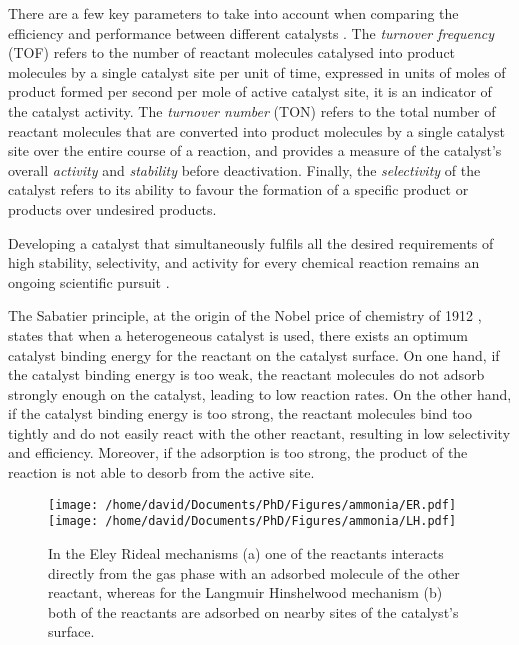 There are a few key parameters to take into account when comparing the efficiency and performance between different catalysts \parencite{Boudart1995, Zhang2019, Wachs2022}.
The \textit{turnover frequency} (TOF) refers to the number of reactant molecules catalysed into product molecules by a single catalyst site per unit of time, expressed in units of moles of product formed per second per mole of active catalyst site, it is an indicator of the catalyst activity.
The \textit{turnover number} (TON) refers to the total number of reactant molecules that are converted into product molecules by a single catalyst site over the entire course of a reaction, and provides a measure of the catalyst's overall \textit{activity} and \textit{stability} before deactivation.
Finally, the \textit{selectivity} of the catalyst refers to its ability to favour the formation of a specific product or products over undesired products.

Developing a catalyst that simultaneously fulfils all the desired requirements of high stability, selectivity, and activity for every chemical reaction remains an ongoing scientific pursuit \parencite{Hagen2016}.

The Sabatier principle, at the origin of the Nobel price of chemistry of 1912 \parencite{Che2013}, states that when a heterogeneous catalyst is used, there exists an optimum catalyst binding energy for the reactant on the catalyst surface.
On one hand, if the catalyst binding energy is too weak, the reactant molecules do not adsorb strongly enough on the catalyst, leading to low reaction rates.
On the other hand, if the catalyst binding energy is too strong, the reactant molecules bind too tightly and do not easily react with the other reactant, resulting in low selectivity and efficiency.
Moreover, if the adsorption is too strong, the product of the reaction is not able to desorb from the active site.

\begin{figure}[!htb]
    \centering
    \texttt{[image: /home/david/Documents/PhD/Figures/ammonia/ER.pdf]}
    \texttt{[image: /home/david/Documents/PhD/Figures/ammonia/LH.pdf]}
    \caption{
        In the Eley Rideal mechanisms (a) one of the reactants interacts directly from the gas phase with an adsorbed molecule of the other reactant, whereas for the Langmuir Hinshelwood mechanism (b) both of the reactants are adsorbed on nearby sites of the catalyst's surface.
    }
    \label{fig:Mechanisms}
\end{figure}

